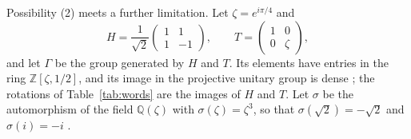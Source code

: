 Possibility (2) meets a further limitation. Let $\zeta=e^{i\pi/4}$ and
\[
H=\frac{1}{\sqrt2}\begin{pmatrix}1&1\\1&-1\end{pmatrix},\qquad T=\begin{pmatrix}1&0\\0&\zeta\end{pmatrix},
\]
and let $\Gamma$ be the group generated by $H$ and $T$. Its elements have entries in the ring $\mathbb{Z}[\zeta,1/2]$, and its image in the projective unitary group is dense \cite{boykin}; the rotations of Table~\ref{tab:words} are the images of $H$ and $T$. Let $\sigma$ be the automorphism of the field $\mathbb{Q}(\zeta)$ with $\sigma(\zeta)=\zeta^3$, so that $\sigma(\sqrt2)=-\sqrt2$ and $\sigma(i)=-i$ \cite{selinger}.

